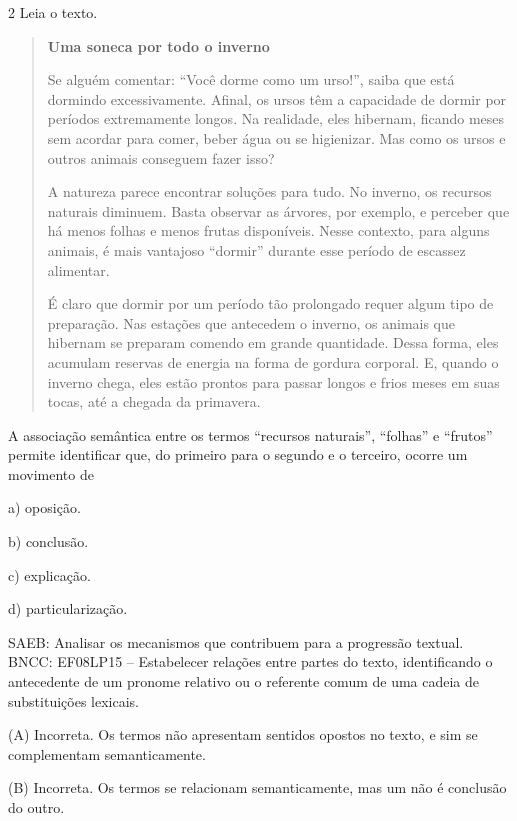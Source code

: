 \num{2} Leia o texto.

\begin{quote}
\textbf{Uma soneca por todo o inverno}

Se alguém comentar: ``Você dorme como um urso!'', saiba que está
dormindo excessivamente. Afinal, os ursos têm a capacidade de dormir por
períodos extremamente longos. Na realidade, eles hibernam, ficando meses
sem acordar para comer, beber água ou se higienizar. Mas como os ursos e
outros animais conseguem fazer isso?

A natureza parece encontrar soluções para tudo. No inverno, os recursos
naturais diminuem. Basta observar as árvores, por exemplo, e perceber
que há menos folhas e menos frutas disponíveis. Nesse contexto, para
alguns animais, é mais vantajoso ``dormir'' durante esse período de
escassez alimentar.

É claro que dormir por um período tão prolongado requer algum tipo de
preparação. Nas estações que antecedem o inverno, os animais que
hibernam se preparam comendo em grande quantidade. Dessa forma, eles
acumulam reservas de energia na forma de gordura corporal. E, quando o
inverno chega, eles estão prontos para passar longos e frios meses em
suas tocas, até a chegada da primavera.
\end{quote}


A associação semântica entre os termos ``recursos naturais'', ``folhas''
e ``frutos'' permite identificar que, do primeiro para o segundo e o
terceiro, ocorre um movimento de

a) oposição.

b) conclusão.

c) explicação.

d) particularização.

SAEB: Analisar os mecanismos que contribuem para a progressão textual.
BNCC: EF08LP15 -- Estabelecer relações entre partes do texto,
identificando o antecedente de um pronome relativo ou o referente comum
de uma cadeia de substituições lexicais.

(A) Incorreta. Os termos não apresentam sentidos opostos no texto, e sim
se complementam semanticamente.

(B) Incorreta. Os termos se relacionam semanticamente, mas um não é
conclusão do outro.

